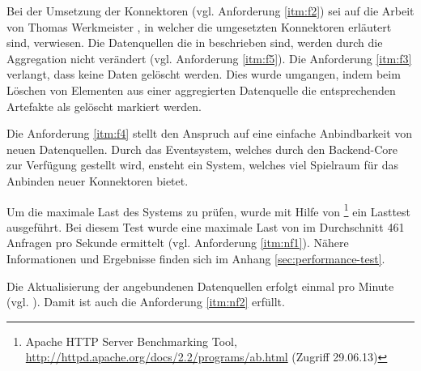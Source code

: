 Bei der Umsetzung der Konnektoren (vgl. Anforderung \ref{itm:f2}) sei auf die Arbeit von Thomas Werkmeister \cite{bp-tewe}, in welcher die umgesetzten Konnektoren erläutert sind, verwiesen. Die Datenquellen die in \cite{bp-tewe} beschrieben sind, werden durch die Aggregation nicht verändert (vgl. Anforderung \ref{itm:f5}). Die Anforderung \ref{itm:f3} verlangt, dass keine Daten gelöscht werden. Dies wurde umgangen, indem beim Löschen von Elementen aus einer aggregierten Datenquelle die entsprechenden Artefakte als gelöscht markiert werden.

Die Anforderung \ref{itm:f4} stellt den Anspruch auf eine einfache Anbindbarkeit von neuen Datenquellen. Durch das Eventsystem, welches durch den Backend-Core zur Verfügung gestellt wird, ensteht ein System, welches viel Spielraum für das Anbinden neuer Konnektoren bietet.

Um die maximale Last des Systems zu prüfen, wurde mit Hilfe von \footnote{Apache HTTP Server Benchmarking Tool, \url{http://httpd.apache.org/docs/2.2/programs/ab.html} (Zugriff 29.06.13)} ein Lasttest ausgeführt. Bei diesem Test wurde eine maximale Last von im Durchschnitt 461 Anfragen pro Sekunde ermittelt (vgl. Anforderung \ref{itm:nf1}). Nähere Informationen und Ergebnisse finden sich im Anhang \ref{sec:performance-test}.

Die Aktualisierung der angebundenen Datenquellen erfolgt einmal pro Minute (vgl. \cite{bp-tewe}). Damit ist auch die Anforderung \ref{itm:nf2} erfüllt.